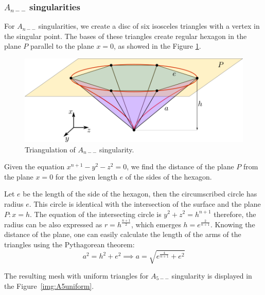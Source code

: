 \subsubsection*{$A_{n--}$ singularities}
\label{An--singularities}
For $A_{n--}$ singularities, we create a disc of six isosceles triangles
with a vertex in the singular point. The bases of these triangles create regular
hexagon in the plane $P$ parallel to the plane $x=0$, as showed in the Figure
\ref{img:11}.
\begin{figure}
    \centerline{\includegraphics[scale=0.5]{images/img11}}
    \caption[Triangulation of $A_{n--}$ singularity]
    {Triangulation of $A_{n--}$ singularity.}
    \label{img:11}
\end{figure}
Given the equation $x^{n+1}-y^2-z^2=0$, we find the distance of the 
plane $P$ from the plane $x=0$ for the given length $e$ of the sides of
the hexagon.

Let $e$ be the length of the side of the hexagon, then the circumscribed
circle has radius $e$. This circle is identical with the intersection of
the surface and the plane $P:x=h$. The equation of the intersecting circle
is $y^2+z^2=h^{n+1}$ therefore, the radius can be also expressed as 
$r=h^{\frac{n+1}{2}}$, which emerges $h=e^{\frac{2}{n+1}}$. Knowing the
distance of the plane, one can easily calculate the length of the arms of
the triangles using the Pythagorean theorem: 
$$a^2=h^2+e^2 \implies a = \sqrt{e^{\frac{4}{n+1}} + e^2}$$

The resulting mesh with uniform triangles for $A_{5--}$ singularity is displayed
in the Figure~\ref{img:A5uniform}.  


